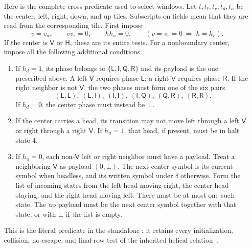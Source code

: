 Here is the complete cross predicate used to select windows. Let
$t,t_{\ell},t_r,t_d,t_u$ be the center, left, right, down, and up tiles.
Subscripts on fields mean that they are read from the corresponding tile.
First impose
\begin{equation}\label{app:boundary-clause}
 v=v_u,\qquad vv_r=0,\qquad hh_u=0,\qquad
 (v=v_r=0\ \Longrightarrow\ h=h_r).
\end{equation}
If the center is $\mathsf V$ or $\mathsf H$, these are its entire tests.
For a nonboundary center, impose all the following additional conditions.
\begin{enumerate}
\item If $h_d=1$, its phase belongs to
$\{\mathsf L,\mathsf I,\mathsf Q,\mathsf R\}$ and its payload is the
one prescribed above. A left $\mathsf V$ requires phase $\mathsf L$;
a right $\mathsf V$ requires phase $\mathsf R$. If the right neighbor is
not $\mathsf V$, the two phases must form one of the six pairs
\[
 (\mathsf L,\mathsf L),\ (\mathsf L,\mathsf I),\
 (\mathsf I,\mathsf I),\ (\mathsf I,\mathsf Q),\
 (\mathsf Q,\mathsf R),\ (\mathsf R,\mathsf R).
\]
If $h_d=0$, the center phase must instead be $\bot$.
\item If the center carries a head, its transition may not move left
through a left $\mathsf V$ or right through a right $\mathsf V$.
If $h_u=1$, that head, if present, must be in halt state $4$.
\item If $h_u=0$, each non-$\mathsf V$ left or right neighbor must have
a payload. Treat a neighboring $\mathsf V$ as payload $(0,\bot)$.
The next center symbol is its current symbol when headless, and its written
symbol under $\delta$ otherwise. Form the list of incoming states from
the left head moving right, the center head staying, and the right head
moving left. There must be at most one such state. The up payload must
be the next center symbol together with that state, or with $\bot$ if
the list is empty.
\end{enumerate}
This is the literal predicate in the standalone
; it retains every
initialization, collision, no-escape, and final-row test of the inherited
helical relation~\cite{CompilerDetails}.

